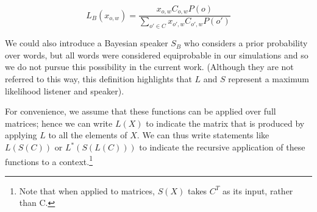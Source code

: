 \begin{equation}
L_B(x_{o,w}) = \frac{x_{o,w} C_{o,w} P(o)}{\displaystyle\sum_{o' \in C} x_{o',w} C_{o',w} P(o')}
\end{equation}

We could also introduce a Bayesian speaker $S_B$ who considers a prior probability over words, but all words were considered equiprobable in our simulations and so we do not pursue this possibility in the current work. (Although they are not referred to this way, this definition highlights that $L$ and $S$ represent a maximum likelihood listener and speaker). 

For convenience, we assume that these functions can be applied over full matrices; hence we can write $L(X)$ to indicate the matrix that is produced by applying $L$ to all the elements of $X$. We can thus write statements like $L(S(C))$ or $L^*(S(L(C)))$ to indicate the recursive application of these functions to a context.\footnote{Note that when applied to matrices, $S(X)$ takes $C^T$ as its input, rather than C.}




